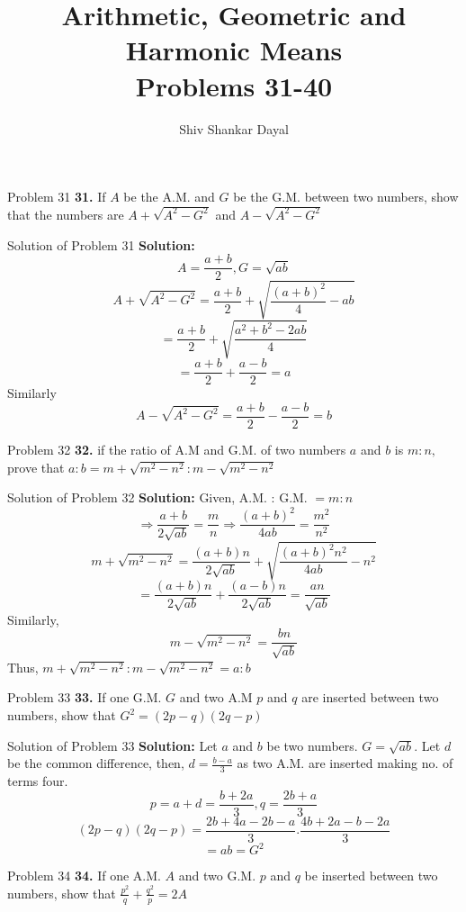 \documentclass[aspectratio=1610,8pt]{beamer}
\title{Arithmetic, Geometric and Harmonic Means\\Problems 31-40}
\author[Shiv Shankar Dayal]{Shiv Shankar Dayal}
\begin{document}
\begin{frame}
  \titlepage
\end{frame}
\begin{frame}{Problem 31}
  \textbf{31.} If $A$ be the A.M. and $G$ be the G.M. between two numbers, show
  that the numbers are $A + \sqrt{A^2 - G^2}$ and $A - \sqrt{A^2 - G^2}$
\end{frame}
\begin{frame}{Solution of Problem 31}
  \textbf{Solution:} $$A = \frac{a + b}{2}, G = \sqrt{ab}$$
  $$A + \sqrt{A^2 - G^2} = \frac{a + b}{2} + \sqrt{\frac{(a + b)^2}{4} - ab}$$
  $$= \frac{a + b}{2} + \sqrt{\frac{a^2 + b^2 - 2ab}{4}}$$
  $$= \frac{a + b}{2} + \frac{a - b}{2} = a$$
  Similarly
  $$A - \sqrt{A^2 - G^2} = \frac{a + b}{2} - \frac{a - b}{2} = b$$
\end{frame}
\begin{frame}{Problem 32}
  \textbf{32.} if the ratio of A.M and G.M. of two numbers $a$ and $b$ is
  $m:n,$ prove that $a:b = m+\sqrt{m^2 - n^2}: m - \sqrt{m^2 - n^2}$
\end{frame}
\begin{frame}{Solution of Problem 32}
  \textbf{Solution:} Given, A.M. : G.M. $= m: n$
  $$\Rightarrow \frac{a + b}{2\sqrt{ab}} = \frac{m}{n} \Rightarrow \frac{(a +
    b)^2}{4ab} = \frac{m^2}{n^2}$$
  $$m + \sqrt{m^2 - n^2} = \frac{(a + b)n}{2\sqrt{ab}} + \sqrt{\frac{(a +
      b)^2n^2}{4ab} - n^2}$$
  $$= \frac{(a + b)n}{2\sqrt{ab}} + \frac{(a - b)n}{2\sqrt{ab}} =
  \frac{an}{\sqrt{ab}}$$
  Similarly,
  $$m - \sqrt{m^2 - n^2} = \frac{bn}{\sqrt{ab}}$$
  Thus, $m+\sqrt{m^2 - n^2}: m - \sqrt{m^2 - n^2} = a:b$
\end{frame}
\begin{frame}{Problem 33}
  \textbf{33.} If one G.M. $G$ and two A.M $p$ and $q$ are inserted between two
  numbers, show that $G^2 = (2p - q)(2q - p)$
\end{frame}
\begin{frame}{Solution of Problem 33}
  \textbf{Solution:} Let $a$ and $b$ be two numbers. $G = \sqrt{ab}.$ Let $d$
  be the common difference, then, $d = \frac{b - a}{3}$ as two A.M. are
  inserted making no. of terms four.
  $$p = a + d = \frac{b + 2a}{3}, q = \frac{2b + a}{3}$$
  $$(2p - q)(2q - p) = \frac{2b + 4a - 2b - a}{3}.\frac{4b + 2a - b - 2a}{3}$$
  $$= ab = G^2$$
\end{frame}
\begin{frame}{Problem 34}
  \textbf{34.} If one A.M. $A$ and two G.M. $p$ and $q$ be inserted between two
  numbers, show that $\frac{p^2}{q} + \frac{q^2}{p} = 2A$
\end{frame}
\end{document}
